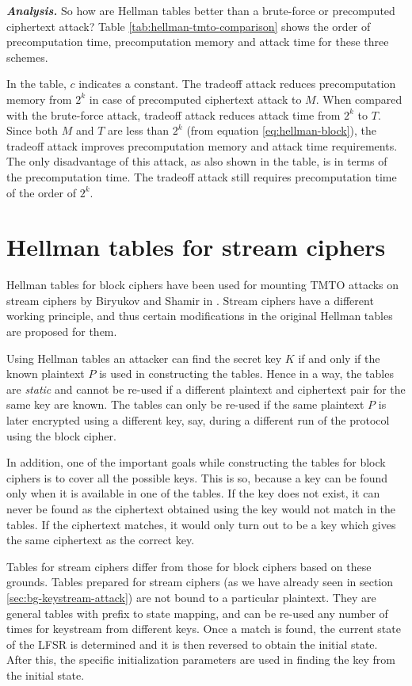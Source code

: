 \noindent \textit{\textbf{Analysis.}} So how are Hellman tables better than a brute-force or precomputed ciphertext attack? Table \ref{tab:hellman-tmto-comparison} shows the order of precomputation time, precomputation memory and attack time for these three schemes. 

In the table, $c$ indicates a constant. The tradeoff attack reduces precomputation memory from $2^k$ in case of precomputed ciphertext attack to $M$. When compared with the brute-force attack, tradeoff attack reduces attack time from $2^k$ to $T$. Since both $M$ and $T$ are less than $2^k$ (from equation \ref{eq:hellman-block}), the tradeoff attack improves precomputation memory and attack time requirements. The only disadvantage of this attack, as also shown in the \mbox{table}, is in terms of the precomputation time. The tradeoff attack still requires precomputation time of the order of $2^k$.

\section{Hellman tables for stream ciphers}

Hellman tables for block ciphers have been used for mounting TMTO attacks on stream ciphers by Biryukov and Shamir in \cite{biryukov2000ctm}. Stream ciphers have a different working principle, and thus certain modifications in the original Hellman tables are proposed for them. 

Using Hellman tables an attacker can find the secret key $K$ if and only if the known plaintext $P$ is used in constructing the tables. Hence in a way, the tables are \emph{static} and cannot be re-used if a different plaintext and ciphertext pair for the same key are known. The tables can only be re-used if the same plaintext $P$ is later encrypted using a different key, say, during a different run of the protocol using the block cipher.

In addition, one of the important goals while constructing the tables for block ciphers is to cover all the possible keys. This is so, because a key can be found only when it is available in one of the tables. If the key does not exist, it can never be found as the ciphertext obtained using the key would not match in the tables. If the ciphertext matches, it would only turn out to be a key which gives the same ciphertext as the correct key. 

Tables for stream ciphers differ from those for block ciphers based on these grounds. Tables prepared for stream ciphers (as we have already seen in section \ref{sec:bg-keystream-attack}) are not bound to a particular plaintext. They are general tables with prefix to state mapping, and can be re-used any number of times for keystream from different keys. Once a match is found, the current state of the LFSR is determined and it is then reversed to obtain the initial state. After this, the specific initialization parameters are used in finding the key from the initial state.

